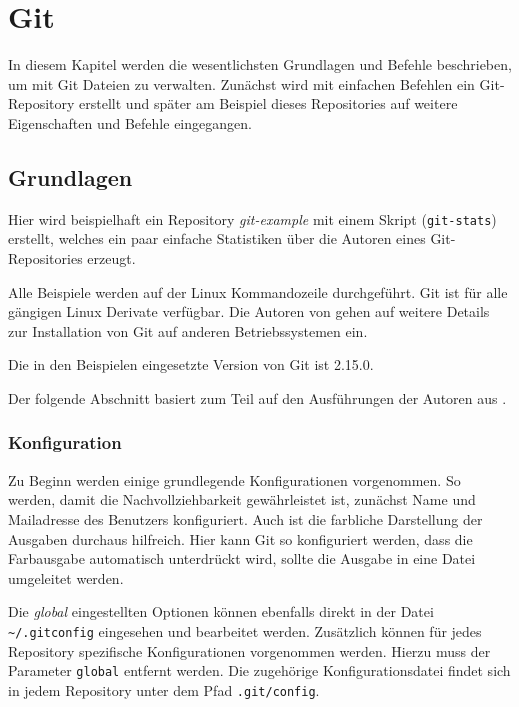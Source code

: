 \chapter{Git}\label{cha:git}
In diesem Kapitel werden die wesentlichsten Grundlagen und Befehle
beschrieben, um mit Git Dateien zu verwalten. Zunächst wird mit einfachen
Befehlen ein Git-Repository erstellt und später am Beispiel dieses Repositories
auf weitere Eigenschaften und Befehle eingegangen.

\section{Grundlagen}\label{gitbasics}
Hier wird beispielhaft ein Repository \textit{git-example} mit einem
Skript (\texttt{git-stats}) erstellt, welches ein paar einfache Statistiken
über die Autoren eines Git-Repositories erzeugt.

Alle Beispiele werden auf der Linux Kommandozeile durchgeführt. Git ist für
alle gängigen Linux Derivate verfügbar. Die Autoren von \cite[S.~12-14]{progit}
gehen auf weitere Details zur Installation von Git auf anderen Betriebssystemen
ein.

Die in den Beispielen eingesetzte Version von Git ist 2.15.0.


Der folgende Abschnitt basiert zum Teil auf den Ausführungen der Autoren aus
\cite[S.22-57]{gitosp}.

\subsection{Konfiguration}\label{gitconfig}
Zu Beginn werden einige grundlegende Konfigurationen vorgenommen. So werden,
damit die Nachvollziehbarkeit gewährleistet ist, zunächst Name und Mailadresse
des Benutzers konfiguriert. Auch ist die farbliche Darstellung der Ausgaben
durchaus hilfreich. Hier kann Git so konfiguriert werden, dass die Farbausgabe
automatisch unterdrückt wird, sollte die Ausgabe in eine Datei umgeleitet
werden.


Die \textit{global} eingestellten Optionen können ebenfalls direkt in der Datei
\texttt{\textasciitilde/.gitconfig} eingesehen und bearbeitet werden.
Zusätzlich können für jedes Repository spezifische Konfigurationen vorgenommen
werden. Hierzu muss der Parameter \texttt{\-\-global} entfernt werden. Die
zugehörige Konfigurationsdatei findet sich in jedem Repository unter dem Pfad
\texttt{.git/config}.

